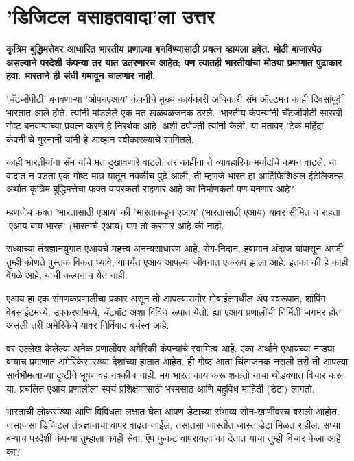 \chapter{'डिजिटल वसाहतवादा'ला उत्तर }

{\textbf{कृत्रिम बुद्धिमत्तेवर आधारित भारतीय प्रणाल्या बनविण्यासाठी प्रयत्न व्हायला हवेत. मोठी बाजारपेठ असल्याने परदेशी कंपन्या तर यात उतरणारच आहेत; पण त्यातही भारतीयांचा मोठ्या प्रमाणात पुढाकार हवा. भारताने ही संधी गमावून चालणार नाही.}}

\vspace{1.5em}

'चॅटजीपीटी' बनवणाऱ्या 'ओपनएआय' कंपनीचे मुख्य कार्यकारी अधिकारी सॅम ऑल्टमन काही दिवसांपूर्वी भारतात आले होते. त्यांनी मांडलेले एक मत खळबळजनक ठरले. 'भारतीय कंपन्यांनी चॅटजीपीटी सारखी गोष्ट बनवण्याच्या प्रयत्न करणे हे निरर्थक आहे' अशी दर्पोक्ती त्यांनी केली. या मतावर 'टेक महिंद्रा कंपनी'चे गुरनानी यांनी हे आव्हान स्वीकारल्याचे सांगितले.

काही भारतीयांना सॅम यांचे मत दुखावणारे वाटले; तर काहींना ते व्यावहारिक मर्यादांचे कथन वाटले. या वादात न पडता एक गोष्ट मात्र यातून नक्कीच पुढे आली, ती म्हणजे भारत हा आर्टिफिशिअल इंटेलिजन्स अर्थात कृत्रिम बुद्धिमत्तेचा फक्त वापरकर्ता राहणार आहे का निर्माणकर्ता पण बनणार आहे?

म्हणजेच फक्त 'भारतासाठी एआय' की 'भारताकडून एआय' (भारतासाठी एआय) यावर सीमित न राहता 'एआय-बाय-भारत' (भारताचे एआय) पण तो करणार आहे की नाही.

सध्याच्या तंत्रज्ञानयुगात एआयचे महत्त्व अनन्यसाधारण आहे. रोग-निदान, हवामान अंदाज यांपासून अगदी तुम्ही कोणते पुस्तक विकत घ्यावे, यापर्यंत एआय आपल्या जीवनात एकरूप झाला आहे. इतका की हे काही वेगळे आहे, याची कल्पनाच येत नाही.

एआय हा एक संगणकप्रणालीचा प्रकार असून तो आपल्यासमोर मोबाईलमधील ॲप स्वरूपात, शॉपिंग वेबसाईटमध्ये, उपकरणांमध्ये, चॅटबॉट अशा विविध रूपात येतो. ह्या एआय प्रणालींची निर्मिती जगभर होत असली तरी अमेरिकेचे यावर निर्विवाद वर्चस्व आहे.

वर उल्लेख केलेल्या अनेक प्रणालींवर अमेरिकी कंपन्यांचे स्वामित्व आहे. एका अर्थाने एआयच्या नाड्या बऱ्याच प्रमाणात अमेरिकेसारख्या देशांच्या हातात आहेत. ही गोष्ट आता चिंताजनक नसली तरी ती आपल्या सार्वभौमत्वाच्या दृष्टीने भूषणावह नक्कीच नाही. मग भारत काय करू शकतो याचा थोडक्यात विचार करू या. प्रचलित एआय प्रणालीला स्वयं प्रशिक्षणासाठी भरमसाठ आणि बहुविध माहिती (डेटा) लागतो.

भारताची लोकसंख्या आणि विविधता लक्षात घेता आपण डेटाच्या संभाव्य सोन-खाणीवरच बसलो आहोत. जसाजसा डिजिटल तंत्रज्ञानाचा वापर वाढत जाईल, तसातसा जास्तीत जास्त डेटा मिळत राहील. सध्या बऱ्याच परदेशी कंपन्या तुम्हाला काही सेवा, ऍप फुकट वापरायला का देतात याचा तुम्ही विचार केला आहे का?

